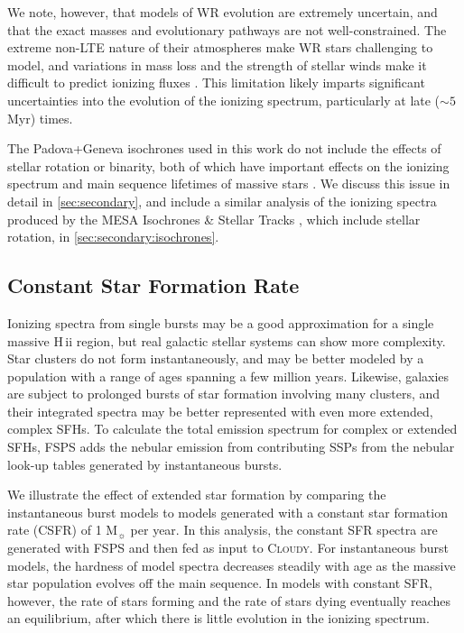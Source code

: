 \documentclass[twocolumn, tighten]{aastex61}
\newcommand{\Sec}[1]{\autoref{sec:#1}}
\newcommand{\FSPS}{{\sc FSPS}\xspace}
\newcommand{\Cloudy}{\textsc{Cloudy}\xspace}
\newcommand\Msun{\ensuremath{\mathrm{M_{\sun}}}}
\newcommand{\hii}{H\,{\sc ii}\xspace}
\begin{document}
We note, however, that models of WR evolution are extremely uncertain, and that the exact masses and evolutionary pathways are not well-constrained. The extreme non-LTE nature of their atmospheres make WR stars challenging to model, and variations in mass loss and the strength of stellar winds make it difficult to predict ionizing fluxes \citep[see review by][and references within]{Crowther07}. This limitation likely imparts significant uncertainties into the evolution of the ionizing spectrum, particularly at late (${\sim}5$ Myr) times.

The Padova+Geneva isochrones used in this work do not include the effects of stellar rotation or binarity, both of which have important effects on the ionizing spectrum and main sequence lifetimes of massive stars \citep[e.g.,][]{Levesque12, Eldridge12}. We discuss this issue in detail in \Sec{secondary}, and include a similar analysis of the ionizing spectra produced by the MESA Isochrones \& Stellar Tracks \citep[MIST,][]{Dotter16, Choi16}, which include stellar rotation, in \Sec{secondary:isochrones}.

\subsection{Constant Star Formation Rate}\label{sec:spectra:CSFH}

Ionizing spectra from single bursts may be a good approximation for a single massive \hii region, but real galactic stellar systems can show more complexity. Star clusters do not form instantaneously, and may be better modeled by a population with a range of ages spanning a few million years. Likewise, galaxies are subject to prolonged bursts of star formation involving many clusters, and their integrated spectra may be better represented with even more extended, complex SFHs. To calculate the total emission spectrum for complex or extended SFHs, FSPS adds the nebular emission from contributing SSPs from the nebular look-up tables generated by instantaneous bursts.

We illustrate the effect of extended star formation by comparing the instantaneous burst models to models generated with a constant star formation rate (CSFR) of 1 \Msun{} per year. In this analysis, the constant SFR spectra are generated with \FSPS and then fed as input to \Cloudy. For instantaneous burst models, the hardness of model spectra decreases steadily with age as the massive star population evolves off the main sequence. In models with constant SFR, however, the rate of stars forming and the rate of stars dying eventually reaches an equilibrium, after which there is little evolution in the ionizing spectrum. 
\end{document}
